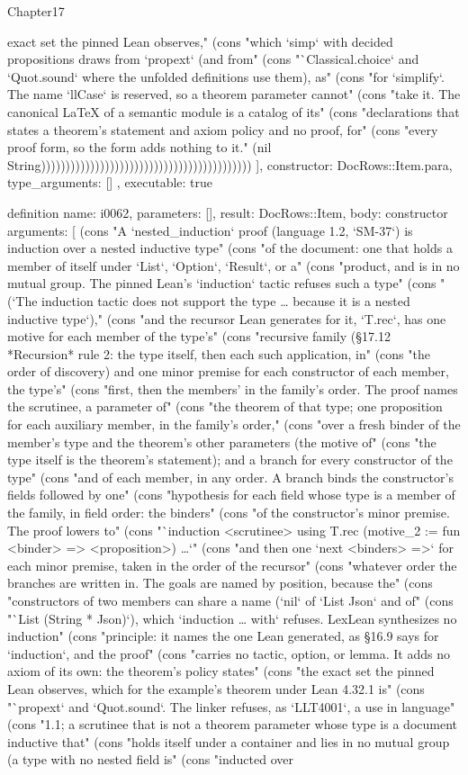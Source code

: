 \begin{lexlean}{Chapter17}
\begin{semanticmodule}
{{exact set the pinned Lean observes," (cons "which `simp` with decided propositions draws from `propext` (and from" (cons "`Classical.choice` and `Quot.sound` where the unfolded definitions use them), as" (cons "for `simplify`. The name `llCase` is reserved, so a theorem parameter cannot" (cons "take it. The canonical LaTeX of a semantic module is a catalog of its" (cons "declarations that states a theorem's statement and axiom policy and no proof, for" (cons "every proof form, so the form adds nothing to it." (nil String)))))))))))))))))))))))))))))))))))))))))))
    ],
    constructor: DocRows::Item.para,
    type_arguments: []
  },
  executable: true
}

definition{
  name: i0062,
  parameters: [],
  result: DocRows::Item,
  body: constructor{
    arguments: [
      (cons "A `nested_induction` proof (language 1.2, `SM-37`) is induction over a nested inductive type" (cons "of the document: one that holds a member of itself under `List`, `Option`, `Result`, or a" (cons "product, and is in no mutual group. The pinned Lean's `induction` tactic refuses such a type" (cons "(`The induction tactic does not support the type … because it is a nested inductive type`)," (cons "and the recursor Lean generates for it, `T.rec`, has one motive for each member of the type's" (cons "recursive family (§17.12 *Recursion* rule 2: the type itself, then each such application, in" (cons "the order of discovery) and one minor premise for each constructor of each member, the type's" (cons "first, then the members' in the family's order. The proof names the scrutinee, a parameter of" (cons "the theorem of that type; one proposition for each auxiliary member, in the family's order," (cons "over a fresh binder of the member's type and the theorem's other parameters (the motive of" (cons "the type itself is the theorem's statement); and a branch for every constructor of the type" (cons "and of each member, in any order. A branch binds the constructor's fields followed by one" (cons "hypothesis for each field whose type is a member of the family, in field order: the binders" (cons "of the constructor's minor premise. The proof lowers to" (cons "`induction <scrutinee> using T.rec (motive_2 := fun <binder> => <proposition>) …`" (cons "and then one `next <binders> =>` for each minor premise, taken in the order of the recursor" (cons "whatever order the branches are written in. The goals are named by position, because the" (cons "constructors of two members can share a name (`nil` of `List Json` and of" (cons "`List (String * Json)`), which `induction … with` refuses. LexLean synthesizes no induction" (cons "principle: it names the one Lean generated, as §16.9 says for `induction`, and the proof" (cons "carries no tactic, option, or lemma. It adds no axiom of its own: the theorem's policy states" (cons "the exact set the pinned Lean observes, which for the example's theorem under Lean 4.32.1 is" (cons "`propext` and `Quot.sound`. The linker refuses, as `LLT4001`, a use in language" (cons "1.1; a scrutinee that is not a theorem parameter whose type is a document inductive that" (cons "holds itself under a container and lies in no mutual group (a type with no nested field is" (cons "inducted over }}
\end{semanticmodule}
\end{lexlean}
